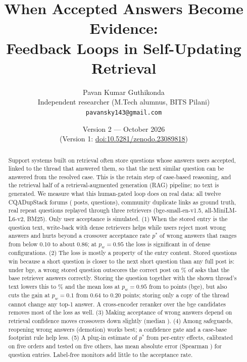 \documentclass[11pt]{article}
\title{When Accepted Answers Become Evidence:\\Feedback Loops in Self-Updating Retrieval}
\author{Pavan Kumar Guthikonda\\
\small Independent researcher (M.Tech alumnus, BITS Pilani)\\
\small \texttt{pavansky143@gmail.com}}
\date{Version 2 --- October 2026\\\small (Version 1: \href{https://doi.org/10.5281/zenodo.23089818}{doi:10.5281/zenodo.23089818})}
\begin{document}
\maketitle

\begin{abstract}
Support systems built on retrieval often store questions whose answers users accepted, linked to the thread that answered them, so that the next similar question can be answered from the resolved case. This is the retain step of case-based reasoning, and the retrieval half of a retrieval-augmented generation (RAG) pipeline; no text is generated. We measure what this human-gated loop does on real data: all twelve CQADupStack forums (\totKB{} posts, \totAsks{} questions), community duplicate links as ground truth, real repeat questions replayed through three retrievers (bge-small-en-v1.5, all-MiniLM-L6-v2, BM25). Only user acceptance is simulated. (1) When the stored entry is the question text, write-back with dense retrievers helps while users reject most wrong answers and hurts beyond a crossover acceptance rate $p^*$ of wrong answers that ranges from below 0.10 to about 0.86; at $p_w=0.95$ the loss is significant in \negNF{} of \nDense{} dense configurations. (2) The loss is mostly a property of the entry content. Stored questions win because a short question is closer to the next short question than any full post is: under bge, a wrong stored question outscores the correct post on \stealBgeAsk\% of asks that the base retriever answers correctly. Storing the question together with the shown thread's text lowers this to \stealBgeAskdoc\% and the mean loss at $p_w=0.95$ from \dNNBgeAsk{} to \dNNBgeAskdoc{} points (bge), but also cuts the gain at $p_w=0.1$ from 0.64 to 0.20 points; storing only a copy of the thread cannot change any top-1 answer. A cross-encoder reranker over the bge candidates removes most of the loss as well. (3) Making acceptance of wrong answers depend on retrieval confidence moves crossovers down slightly (median \diffMedShift). (4) Among safeguards, reopening wrong answers (demotion) works best; a confidence gate and a case-base footprint rule help less. (5) A plug-in estimate of $p^*$ from per-entry effects, calibrated on five orders and tested on five others, has mean absolute error \oosMAEAskTh{} (Spearman \oosRhoAskTh) for question entries. Label-free monitors add little to the acceptance rate.
\end{abstract}
\end{document}
